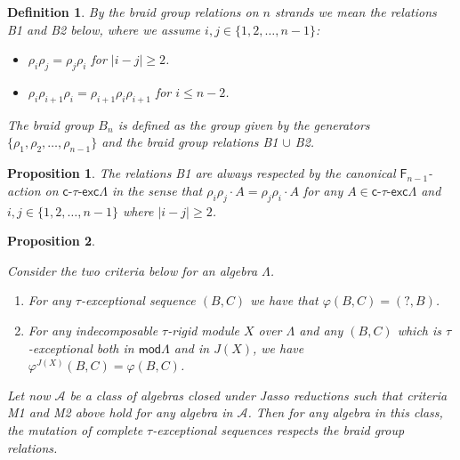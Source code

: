 \documentclass[10pt,a4paper]{amsart}
\newtheorem{definition}{Definition}
\newtheorem{proposition}{Proposition}
\newcommand{\ctauexc}[1]{\ensuremath{\mathsf{c}\text{-}\tau\text{-}\mathsf{exc} #1}}
\newcommand{\freegroup}[1]{\ensuremath{\mathsf{F}_{#1}}}
\newcommand{\mods}{\mathsf{mod}}
\begin{document}
\begin{definition}\label{def:braidgroup_relations}
    By the braid group relations on $n$ strands we mean the relations B1 and B2 below, where we assume $i,j \in \{1,2,\dots,n-1\}$: \begin{itemize}
         \item[\quad B1:] $\rho_i\rho_j = \rho_j\rho_i$ for $|i-j|\geq 2$.
        \item[\quad B2:] $\rho_{i}\rho_{i+1}\rho_{i} = \rho_{i+1}\rho_{i}\rho_{i+1}$ for $i\leq n-2$.
    \end{itemize}

    The braid group $B_n$ is defined as the group given by the generators $\{ \rho_1,\rho_2,\dots,\rho_{n-1} \}$ and the braid group relations B1 $\cup$ B2. 

\end{definition}

\begin{proposition}\label{prop:b1_relations_holds}
    The relations B1 are always respected by the canonical $\freegroup{n-1}$-action on $\ctauexc{\Lambda}$ in the sense that $\rho_i\rho_j\cdot A = \rho_j \rho_i \cdot A$ for any $A \in \ctauexc{\Lambda}$ and $i,j \in \{1,2,\dots,n-1\}$ where $|i-j|\geq 2$.
\end{proposition}

\begin{proposition}\label{prop:properties_mutation_braid_group}

    Consider the two criteria below for an algebra $\Lambda$.

    \begin{enumerate}
        \item[M1:] For any $\tau$-exceptional sequence $(B,C)$ we have that $\varphi(B,C) = (?,B)$.
        \item[M2:] For any indecomposable $\tau$-rigid module $X$ over $\Lambda$ and any $(B,C)$ which is $\tau$-exceptional both in $\mods \Lambda$ and in $J(X)$, we have $\varphi^{J(X)}(B,C) = \varphi(B,C)$.
    \end{enumerate}

    Let now $\mathcal{A}$ be a class of algebras closed under Jasso reductions such that criteria M1 and M2 above hold for any algebra in $\mathcal{A}$. Then for any algebra in this class, the mutation of complete $\tau$-exceptional sequences respects the braid group relations.
\end{proposition}
\end{document}
